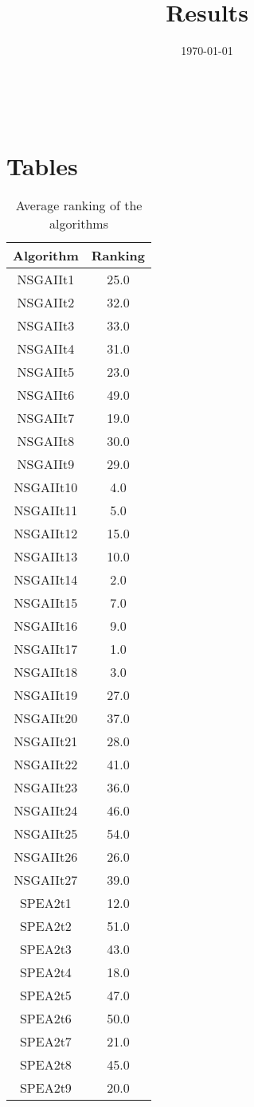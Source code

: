 \documentclass{article}
\title{Results}
\author{}
\date{\today}
\begin{document}
\oddsidemargin 0in \topmargin 0in\maketitle
\
\section{Tables}
\begin{table}[!htp]
\centering
\caption{Average ranking of the algorithms}
\begin{tabular}{c|c}
Algorithm&Ranking\\
\hline
NSGAIIt1&25.0\\
NSGAIIt2&32.0\\
NSGAIIt3&33.0\\
NSGAIIt4&31.0\\
NSGAIIt5&23.0\\
NSGAIIt6&49.0\\
NSGAIIt7&19.0\\
NSGAIIt8&30.0\\
NSGAIIt9&29.0\\
NSGAIIt10&4.0\\
NSGAIIt11&5.0\\
NSGAIIt12&15.0\\
NSGAIIt13&10.0\\
NSGAIIt14&2.0\\
NSGAIIt15&7.0\\
NSGAIIt16&9.0\\
NSGAIIt17&1.0\\
NSGAIIt18&3.0\\
NSGAIIt19&27.0\\
NSGAIIt20&37.0\\
NSGAIIt21&28.0\\
NSGAIIt22&41.0\\
NSGAIIt23&36.0\\
NSGAIIt24&46.0\\
NSGAIIt25&54.0\\
NSGAIIt26&26.0\\
NSGAIIt27&39.0\\
SPEA2t1&12.0\\
SPEA2t2&51.0\\
SPEA2t3&43.0\\
SPEA2t4&18.0\\
SPEA2t5&47.0\\
SPEA2t6&50.0\\
SPEA2t7&21.0\\
SPEA2t8&45.0\\
SPEA2t9&20.0\\

\end{tabular}
\end{table}
\end{document}

